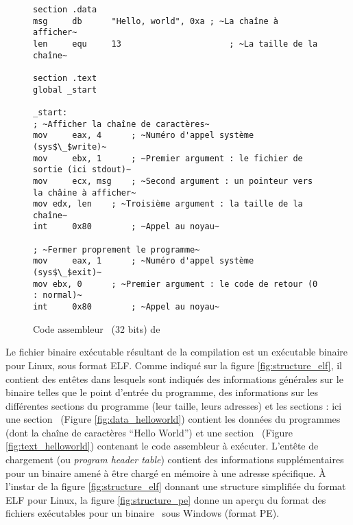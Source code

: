 \begin{figure}
\begin{lstlisting}[language={[x86masm]Assembler}, escapechar=~]
section .data
msg     db      "Hello, world", 0xa	; ~La chaîne à afficher~
len     equ     13                      ; ~La taille de la chaîne~

section .text
global _start

_start:
; ~Afficher la chaîne de caractères~
mov     eax, 4      ; ~Numéro d'appel système (sys$\_$write)~
mov     ebx, 1      ; ~Premier argument : le fichier de sortie (ici stdout)~
mov     ecx, msg    ; ~Second argument : un pointeur vers la châine à afficher~
mov	edx, len    ; ~Troisième argument : la taille de la chaîne~
int     0x80        ; ~Appel au noyau~

; ~Fermer proprement le programme~
mov     eax, 1      ; ~Numéro d'appel système (sys$\_$exit)~
mov	ebx, 0	    ; ~Premier argument : le code de retour (0 : normal)~
int     0x80	    ; ~Appel au noyau~
\end{lstlisting}
\caption{Code assembleur \xq\ (32 bits) de \helloworld}
\label{fig:helloword_asm}
\end{figure}

Le fichier binaire exécutable résultant de la compilation est un exécutable binaire pour Linux, sous format ELF.
Comme indiqué sur la figure \ref{fig:structure_elf}, il contient des entêtes dans lesquels sont indiqués des informations générales sur le binaire telles que le point d'entrée du programme, des informations sur les différentes sections du programme (leur taille, leurs adresses) et les sections : ici une section \pdata\ (Figure \ref{fig:data_helloworld}) contient les données du programmes (dont la chaîne de caractères ``Hello World'') et une section \ptext\ (Figure \ref{fig:text_helloworld}) contenant le code assembleur à exécuter. L'entête de chargement (ou \emph{program header table}) contient des informations supplémentaires pour un binaire amené à être chargé en mémoire à une adresse spécifique.
À l'instar de la figure \ref{fig:structure_elf} donnant une structure simplifiée du format ELF pour Linux, la figure \ref{fig:structure_pe} donne un aperçu du format des fichiers exécutables pour un binaire \xq\ sous Windows (format PE).

